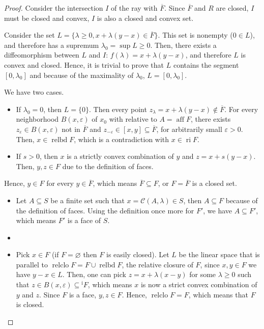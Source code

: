 \begin{proof}
  Consider the intersection \( I \) of the ray with \( \overline{F} \). Since \(
  \overline{F}\) and \( R \) are closed, \( I \) must be closed and convex, \( I
  \) is also a closed and convex set.

  Consider the set \( L = \{ \lambda \ge 0, x + \lambda(y - x) \in
  \overline{F}\}   \). This set is nonempty (\( 0 \in L \)), and therefore has
  a supremum \( \lambda_{0} = \sup L \ge 0 \). Then, there exists a
  diffeomorphism between \( L \) and \( I \): \( f(\lambda) = x + \lambda(y - x)
  \), and therefore \( L \) is convex and closed. Hence, it is trivial to prove
  that \( L \) contains the segment \( [0, \lambda_{0}] \) and because of the
  maximality of \( \lambda_{0} \), \( L = [0, \lambda_{0}] \).

  We have two cases.
  \begin{itemize}
  \item If \( \lambda_{0} = 0 \), then \( L = \{0\}   \). Then every point \(
    z_{\lambda}
    = x + \lambda(y - x) \notin \overline{F}\). For every neighborhood \( B(x,
    \varepsilon) \)
    of \( x_{0} \) with relative to \( A = \operatorname{aff} F \), there exists
    \( z_{\varepsilon} \in B(x, \varepsilon) \) not in \( \overline{F} \) and \(
    z_{-\varepsilon} \in [x, y] \subseteq \overline{F} \), for arbitrarily small
    \( \varepsilon > 0 \). Then, \( x \in \operatorname{relbd} F \), which is a
    contradiction with \( x \in \operatorname{ri} F \).
  \item If \( s > 0 \), then \( x \) is a strictly convex combination of \( y \)
    and \( z = x + s(y - x) \). Then, \( y, z \in F \) due to the definition of
    faces.
  \end{itemize}

  Hence, \( y \in F \) for every \( y \in \overline{F} \), which means \(
  \overline{F} \subseteq F \), or \( F = \overline{F} \) is a closed set.

  \iffalse
  \begin{itemize}
    \item Let \( A \subseteq S \) be a finite set such that \( x =
      \mathcal{C}(A, \lambda) \in S \), then \( A \subseteq F \) because of the
      definition of faces. Using the definition once more for \( F' \), we have
      \( A \subseteq F' \), which means \( F' \) is a face of \( S \).


    \item 
    \item Pick \( x \in F \) (if \( F = \varnothing \) then \( F \) is easily
      closed). Let \( L \) be the linear space that is parallel to \(
      \operatorname{relclo} F = F \cup \operatorname{relbd} F \), the relative
      closure of \( F \), since \( x, y \in F \) we have \( y - x \in L \).
      Then, one can pick \( z = x + \lambda(x - y) \) for some \( \lambda \ge 0
      \) such that \( z \in B(x, \varepsilon) \subseteq \operatorname{^{i} } F
      \), which means \( x \) is now a strict convex combination of \( y \) and
      \( z \). Since \( F \) is a face, \( y, z \in F \). Hence, \(
      \operatorname{relclo} F = F \), which means that \( F \) is closed.


\end{itemize}
\end{proof}

